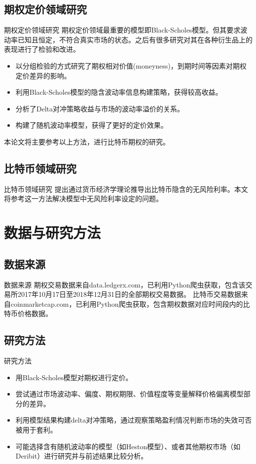 \documentclass[11pt,dark]{mathbeamer}
\begin{document}
\subsection{期权定价领域研究}
\begin{frame}{期权定价领域研究}
  期权定价领域最重要的模型即Black-Scholes模型\cite{Fische-1973}。但其要求波动率已知且恒定，不符合真实市场的状态。之后有很多研究对其在各种衍生品上的表现进行了检验和改进。
  \begin{itemize}
    \item {}以分组检验的方式研究了期权相对价值(moneyness)，到期时间等因素对期权定价差异的影响。
    \item {}利用Black-Scholes模型的隐含波动率信息构建策略，获得较高收益。
    \item {} 分析了Delta对冲策略收益与市场的波动率溢价的关系。
    \item {} 构建了随机波动率模型，获得了更好的定价效果。
  \end{itemize}
  本论文将主要参考以上方法，进行比特币期权的研究。
\end{frame}

\subsection{比特币领域研究}
\begin{frame}{比特币领域研究}
   提出通过货币经济学理论推导出比特币隐含的无风险利率。本文将参考这一方法解决模型中无风险利率设定的问题。
\end{frame}
\section{数据与研究方法}
\subsection{数据来源}
\begin{frame}{数据来源}
  期权交易数据来自data.ledgerx.com，已利用Python爬虫获取，包含该交易所2017年10月17日至2018年12月31日的全部期权交易数据。
  比特币交易数据来自coinmarketcap.com，已利用Python爬虫获取，包含期权数据对应时间段内的比特币价格数据。
\end{frame}
\subsection{研究方法}
\begin{frame}{研究方法}
  \begin{itemize}
    \item 用Black-Scholes模型对期权进行定价。
    \item 尝试通过市场波动率、偏度、期权期限、价值程度等变量解释价格偏离模型部分的差异。
    \item 利用模型结果构建delta对冲策略，通过观察策略盈利情况判断市场的失效可否被用于套利。
    \item 可能选择含有随机波动率的模型（如Heston模型）、或者其他期权市场（如Deribit）进行研究并与前述结果比较分析。
  \end{itemize}
\end{frame}
\end{document}
